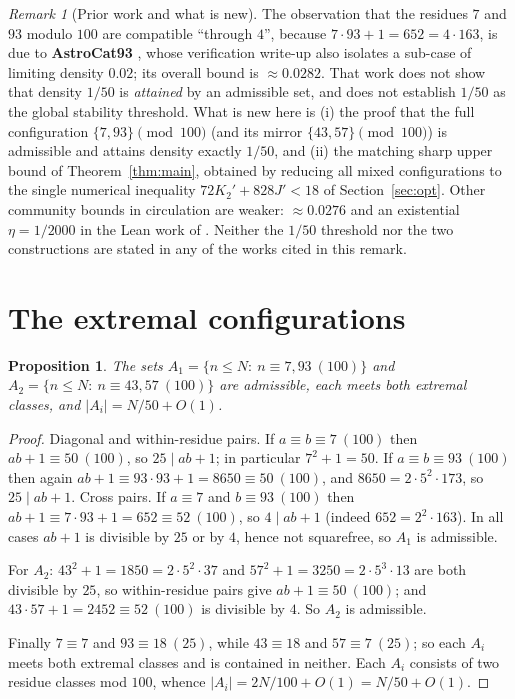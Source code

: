 \documentclass[11pt,a4paper]{article}
\theoremstyle{plain}
\newtheorem{proposition}[theorem]{Proposition}
\theoremstyle{definition}
\theoremstyle{remark}
\newtheorem{remark}[theorem]{Remark}
\begin{document}
\begin{remark}[Prior work and what is new]\label{rem:prior}
The observation that the residues $7$ and $93$ modulo $100$ are compatible ``through $4$'', because
$7\cdot 93+1=652=4\cdot 163$, is due to \textbf{AstroCat93} \cite{AstroCat}, whose verification write-up
also isolates a sub-case of limiting density $0.02$; its overall bound is $\approx 0.0282$. That work
does not show that density $1/50$ is \emph{attained} by an admissible set, and does not establish
$1/50$ as the global stability threshold. What is new here is (i) the proof that the full
configuration $\{7,93\}\pmod{100}$ (and its mirror $\{43,57\}\pmod{100}$) is admissible and attains
density exactly $1/50$, and (ii) the matching sharp upper bound of Theorem~\ref{thm:main}, obtained by
reducing all mixed configurations to the single numerical inequality $72K_2'+828J'<18$ of
Section~\ref{sec:opt}. Other community bounds in circulation are weaker: $\approx 0.0276$
\cite{Bzanghi} and an existential $\eta=1/2000$ in the Lean work of
\cite{Obstacle}. Neither the $1/50$ threshold nor the two constructions are stated in any of the
works cited in this remark.
\end{remark}

\section{The extremal configurations}\label{sec:extremal}

\begin{proposition}\label{prop:extremal}
The sets $A_1=\{n\le N:\ n\equiv 7,93\ (100)\}$ and $A_2=\{n\le N:\ n\equiv 43,57\ (100)\}$ are
admissible, each meets both extremal classes, and $|A_i|=N/50+O(1)$.
\end{proposition}

\begin{proof}
Diagonal and within-residue pairs. If $a\equiv b\equiv 7\ (100)$ then $ab+1\equiv 50\ (100)$, so
$25\mid ab+1$; in particular $7^2+1=50$. If $a\equiv b\equiv 93\ (100)$ then again
$ab+1\equiv 93\cdot 93+1=8650\equiv 50\ (100)$, and $8650=2\cdot 5^2\cdot 173$, so $25\mid ab+1$.
Cross pairs. If $a\equiv 7$ and $b\equiv 93\ (100)$ then $ab+1\equiv 7\cdot 93+1=652\equiv 52\ (100)$,
so $4\mid ab+1$ (indeed $652=2^2\cdot 163$). In all cases $ab+1$ is divisible by $25$ or by $4$, hence
not squarefree, so $A_1$ is admissible.

For $A_2$: $43^2+1=1850=2\cdot 5^2\cdot 37$ and $57^2+1=3250=2\cdot 5^3\cdot 13$ are both divisible by
$25$, so within-residue pairs give $ab+1\equiv 50\ (100)$; and $43\cdot 57+1=2452\equiv 52\ (100)$ is
divisible by $4$. So $A_2$ is admissible.

Finally $7\equiv 7$ and $93\equiv 18\ (25)$, while $43\equiv 18$ and $57\equiv 7\ (25)$; so each $A_i$
meets both extremal classes and is contained in neither. Each $A_i$ consists of two residue classes
mod $100$, whence $|A_i|=2N/100+O(1)=N/50+O(1)$.
\end{proof}
\end{document}

